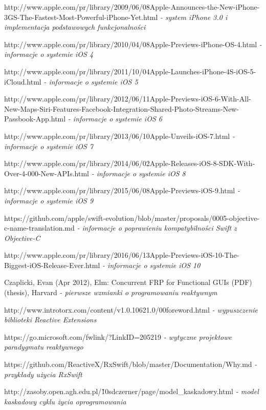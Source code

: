 \documentclass[12pt,oneside,a4paper]{report}
\begin{document}
\begin{thebibliography}{50}
 http://www.apple.com/pr/library/2009/06/08Apple-Announces-the-New-iPhone-3GS-The-Fastest-Most-Powerful-iPhone-Yet.html
\emph{ - system iPhone 3.0 i implementacja podstawowych funkcjonalności}

http://www.apple.com/pr/library/2010/04/08Apple-Previews-iPhone-OS-4.html
\emph{ - informacje o systemie iOS 4}

http://www.apple.com/pr/library/2011/10/04Apple-Launches-iPhone-4S-iOS-5-iCloud.html
\emph{ - informacje o systemie iOS 5}

http://www.apple.com/pr/library/2012/06/11Apple-Previews-iOS-6-With-All-New-Maps-Siri-Features-Facebook-Integration-Shared-Photo-Streams-New-Passbook-App.html
\emph{ - informacje o systemie iOS 6}

http://www.apple.com/pr/library/2013/06/10Apple-Unveils-iOS-7.html
\emph{ - informacje o systemie iOS 7}

http://www.apple.com/pr/library/2014/06/02Apple-Releases-iOS-8-SDK-With-Over-4-000-New-APIs.html
\emph{ - informacje o systemie iOS 8}

http://www.apple.com/pr/library/2015/06/08Apple-Previews-iOS-9.html
\emph{ - informacje o systemie iOS 9}

https://github.com/apple/swift-evolution/blob/master/proposals/0005-objective-c-name-translation.md
\emph{ - informacje o poprawieniu kompatybilności Swift z Objective-C}

http://www.apple.com/pr/library/2016/06/13Apple-Previews-iOS-10-The-Biggest-iOS-Release-Ever.html
\emph{ - informacje o systemie iOS 10}

 Czaplicki, Evan (Apr 2012), Elm: Concurrent FRP for Functional GUIs (PDF) (thesis), Harvard
\emph{ - pierwsze wzmianki o programowaniu reaktywnym}

 http://www.introtorx.com/content/v1.0.10621.0/00foreword.html
\emph{ - wypuszczenie biblioteki Reactive Extensions}

 https://go.microsoft.com/fwlink/?LinkID=205219
\emph{ - wytyczne projektowe paradygmatu reaktywnego}

https://github.com/ReactiveX/RxSwift/blob/master/Documentation/Why.md
\emph{ - przykłady użycia RxSwift}

 http://zasoby.open.agh.edu.pl/\~10sdczerner/page/model\_kaskadowy.html
\emph{ - model kaskadowy cyklu życia oprogramowania}


\end{thebibliography}
\end{document}
